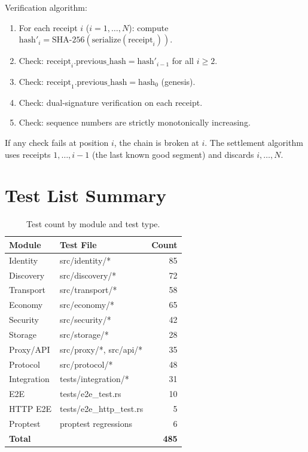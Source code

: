 Verification algorithm:
\begin{enumerate}
  \item For each receipt $i$ ($i = 1, \ldots, N$): compute $\text{hash}'_i = \text{SHA-256}(\text{serialize}(\text{receipt}_i))$.
  \item Check: $\text{receipt}_i.\text{previous\_hash} = \text{hash}'_{i-1}$ for all $i \geq 2$.
  \item Check: $\text{receipt}_1.\text{previous\_hash} = \text{hash}_0$ (genesis).
  \item Check: dual-signature verification on each receipt.
  \item Check: sequence numbers are strictly monotonically increasing.
\end{enumerate}

If any check fails at position $i$, the chain is broken at $i$. The settlement algorithm uses receipts $1, \ldots, i-1$ (the last known good segment) and discards $i, \ldots, N$.

\section{Test List Summary}

\begin{table}[h]
\centering
\small
\begin{tabular}{@{}llr@{}}
\toprule
Module & Test File & Count \\
\midrule
Identity & src/identity/* & 85 \\
Discovery & src/discovery/* & 72 \\
Transport & src/transport/* & 58 \\
Economy & src/economy/* & 65 \\
Security & src/security/* & 42 \\
Storage & src/storage/* & 28 \\
Proxy/API & src/proxy/*, src/api/* & 35 \\
Protocol & src/protocol/* & 48 \\
\midrule
Integration & tests/integration/* & 31 \\
E2E & tests/e2e\_test.rs & 10 \\
HTTP E2E & tests/e2e\_http\_test.rs & 5 \\
Proptest & proptest regressions & 6 \\
\midrule
\textbf{Total} & & \textbf{485} \\
\bottomrule
\end{tabular}
\caption{Test count by module and test type.}
\label{tab:test-list}
\end{table}

